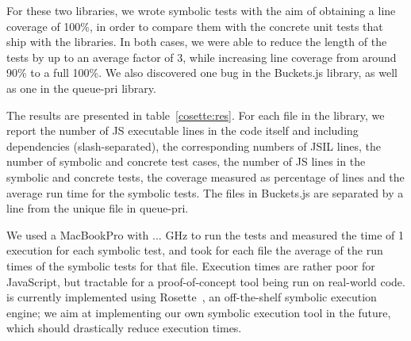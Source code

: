 For these two libraries, we wrote symbolic tests with the aim of obtaining a line coverage of 100\%, in order to compare them with the concrete unit tests that ship with the libraries.
In both cases, we were able to reduce the length of the tests by up to an average factor of 3, while increasing line coverage from around 90\% to a full 100\%.
We also discovered one bug in the Buckets.js library, as well as one in the queue-pri library.


The results are presented in table~\ref{cosette:res}.
For each file in the library, we report the number of JS executable lines in the code itself and including dependencies (slash-separated), the corresponding numbers of JSIL lines, the number of symbolic and concrete test cases, the number of JS lines in the symbolic and concrete tests, the coverage measured as percentage of lines and the average \cosette run time for the symbolic tests.
The files in Buckets.js are separated by a line from the unique file in queue-pri.

We used a MacBookPro with ... GHz to run the tests and measured the time of 1 execution for each symbolic test, and took for each file the average of the run times of the symbolic tests for that file.
Execution times are rather poor for JavaScript, but tractable for a proof-of-concept tool being run on real-world code.
\cosette is currently implemented using Rosette~\cite{Rosette1}, an off-the-shelf symbolic execution engine; we aim at implementing our own symbolic execution tool in the future, which should drastically reduce execution times.

